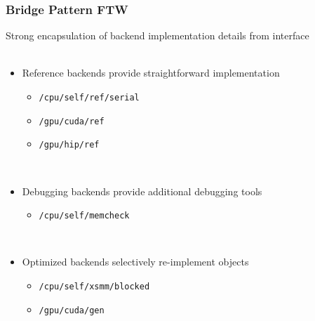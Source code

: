 \documentclass{beamer}
\begin{document}
\begin{frame}
\begin{center}
\frametitle{Bridge Pattern FTW}

Strong encapsulation of backend implementation details from interface\\

~\\

\begin{itemize}

\item Reference backends provide straightforward implementation\\

\begin{itemize}

\item \lstinline{/cpu/self/ref/serial}

\item \lstinline{/gpu/cuda/ref}

\item \lstinline{/gpu/hip/ref}

\end{itemize}

~\\

\item Debugging backends provide additional debugging tools\\

\begin{itemize}

\item \lstinline{/cpu/self/memcheck}

\end{itemize}

~\\

\item Optimized backends selectively re-implement objects\\

\begin{itemize}

\item \lstinline{/cpu/self/xsmm/blocked}

\item \lstinline{/gpu/cuda/gen}

\end{itemize}

\end{itemize}

\end{center}
\end{frame}
\end{document}
